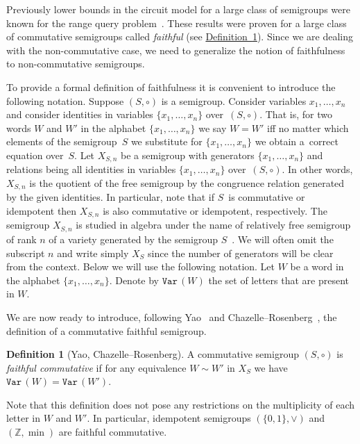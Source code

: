 \documentclass[11pt]{article}
\numberwithin{equation}{section}
\theoremstyle{definition}
\newtheorem{definition}[theorem]{Definition}
\theoremstyle{plain}
\newcommand{\expref}[2]{\hyperref[#2]{#1~\ref{#2}}}
\theoremstyle{plain}\newtheorem{observation}[theorem]{Observation}
\newcommand{\var}{\texttt{Var}\,}  %
\begin{document}
Previously lower bounds in the circuit model for a large class of semigroups
were known for
%
%
the range query
problem~\cite{DBLP:conf/stoc/Yao82,DBLP:journals/ijcga/ChazelleR91}. These
results were proven for a large class of commutative semigroups called
\emph{faithful} (see \expref{Definition}{def:faithfulcommutative}). Since we are dealing
with the non-commutative case, we need to generalize the notion of faithfulness
to non-commutative semigroups.

To provide a formal definition of faithfulness it is convenient to introduce the
following notation. Suppose $(S, \circ)$ is a
semigroup.  %
%
%
%
%
%
%
%
%
%
Consider variables $x_1,\ldots, x_n$ and consider identities in variables $\{x_1,\ldots, x_n\}$ over~$(S,\circ)$.
That is, for two words $W$ and $W'$ in
the alphabet $\{x_1,\ldots,x_n\}$ we say $W = W'$ iff no matter
which elements of the semigroup~$S$ we substitute for $\{x_1,\ldots, x_n\}$ we
obtain a~correct equation over~$S$.
Let $X_{S,n}$ be a semigroup with generators $\{x_1,\ldots, x_n\}$
and relations being all identities in variables $\{x_1,\ldots, x_n\}$ over~$(S,\circ)$.
%
In  %
other words, $X_{S,n}$ is the quotient of the free semigroup by the congruence relation generated by the given identities.
%
In particular, note that if $S$~is
%
%
commutative or idempotent then $X_{S,n}$ is also commutative or idempotent,
respectively.  %
The semigroup $X_{S,n}$ is studied in algebra under the name of relatively free
semigroup of rank $n$ of a variety generated by
the   %
semigroup
$S$~\cite{neumann2012varieties}. %
%
We will often omit the subscript $n$ and write
simply $X_S$ since the number of generators will be clear from the context.
Below we will use the following notation. Let $W$ be a word in the alphabet
$\{x_1,\ldots, x_n\}$. Denote by $\var(W)$ the set of letters that are present
in $W$.

We are now ready to introduce,
%
following Yao~\cite{DBLP:conf/stoc/Yao82} and
Chazelle--Rosenberg~\cite{DBLP:journals/ijcga/ChazelleR91},  %
the definition of a commutative faithful semigroup.

\begin{definition}[Yao, Chazelle--Rosenberg]  %
%
%
%
\label{def:faithfulcommutative}
A commutative semigroup $(S, \circ)$ is \emph{faithful commutative} if for any
equivalence $W\sim W'$ in $X_S$ we have $\var(W)=\var(W')$.
\end{definition}


Note that this definition does not pose any restrictions on the
%
%
multiplicity
of
each letter %
%
%
in $W$ and $W'$. In particular, %
%
%
idempotent semigroups
$(\{0,1\}, \vee)$ and $(\mathbb{Z},\min)$ are faithful commutative. %
%
%
%
\end{document}
